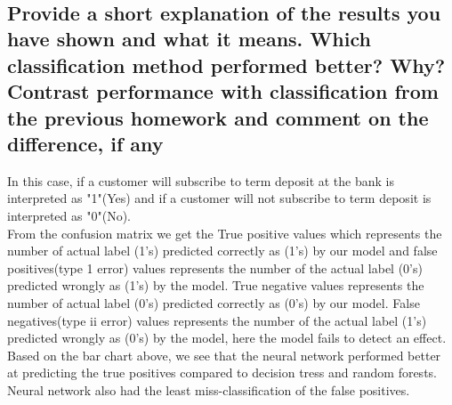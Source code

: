 \\


\newpage
\subsection{Provide a short explanation of the results you have shown and what it means. Which classification method performed better? Why? Contrast performance with classification from the previous homework and comment on the difference, if any}
In this case, if a customer will subscribe to term deposit at the bank is interpreted as "1"(Yes) and if a customer will not subscribe to term deposit is interpreted as "0"(No).\\

From the confusion matrix we get the True positive values  which represents the number of actual label (1's) predicted correctly as (1's) by our model and false positives(type 1 error) values represents the number of the  actual label (0's) predicted wrongly as (1's) by the model. True negative values represents the number of actual label (0's) predicted correctly as (0's) by our model. False negatives(type ii error) values represents the number of the  actual label (1's) predicted wrongly as (0's) by the model, here the model fails to detect an effect. Based on the bar chart above, we see that the neural network performed better at predicting the true positives compared to decision tress and random forests. Neural network also had the least miss-classification of the false positives.



